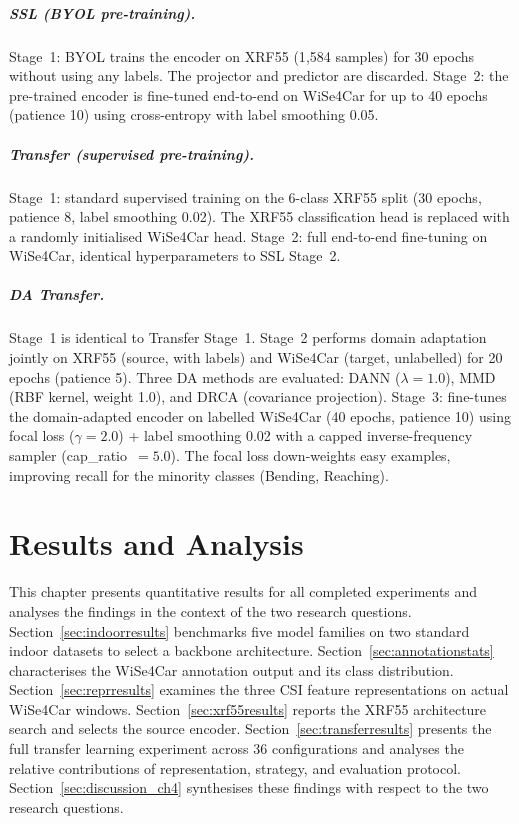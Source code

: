 \documentclass[english,bibtex]{kththesis}
\begin{document}
\paragraph{SSL (BYOL pre-training).} Stage~1: BYOL trains the encoder on XRF55 (1{,}584 samples) for 30 epochs without using any labels. The projector and predictor are discarded. Stage~2: the pre-trained encoder is fine-tuned end-to-end on WiSe4Car for up to 40 epochs (patience 10) using cross-entropy with label smoothing 0.05.

\paragraph{Transfer (supervised pre-training).} Stage~1: standard supervised training on the 6-class XRF55 split (30 epochs, patience 8, label smoothing 0.02). The XRF55 classification head is replaced with a randomly initialised WiSe4Car head. Stage~2: full end-to-end fine-tuning on WiSe4Car, identical hyperparameters to SSL Stage~2.

\paragraph{DA Transfer.} Stage~1 is identical to Transfer Stage~1. Stage~2 performs domain adaptation jointly on XRF55 (source, with labels) and WiSe4Car (target, unlabelled) for 20 epochs (patience 5). Three DA methods are evaluated: DANN ($\lambda = 1.0$), MMD (RBF kernel, weight 1.0), and DRCA (covariance projection). Stage~3: fine-tunes the domain-adapted encoder on labelled WiSe4Car (40 epochs, patience 10) using focal loss ($\gamma = 2.0$) + label smoothing 0.02 with a capped inverse-frequency sampler (cap\_ratio~$= 5.0$). The focal loss down-weights easy examples, improving recall for the minority classes (Bending, Reaching).

\cleardoublepage

\chapter{Results and Analysis}
\label{ch:resultsAndAnalysis}

This chapter presents quantitative results for all completed experiments and analyses the findings in the context of the two research questions. Section~\ref{sec:indoorresults} benchmarks five model families on two standard indoor datasets to select a backbone architecture. Section~\ref{sec:annotationstats} characterises the WiSe4Car annotation output and its class distribution. Section~\ref{sec:reprresults} examines the three CSI feature representations on actual WiSe4Car windows. Section~\ref{sec:xrf55results} reports the XRF55 architecture search and selects the source encoder. Section~\ref{sec:transferresults} presents the full transfer learning experiment across 36 configurations and analyses the relative contributions of representation, strategy, and evaluation protocol. Section~\ref{sec:discussion_ch4} synthesises these findings with respect to the two research questions.
\end{document}
